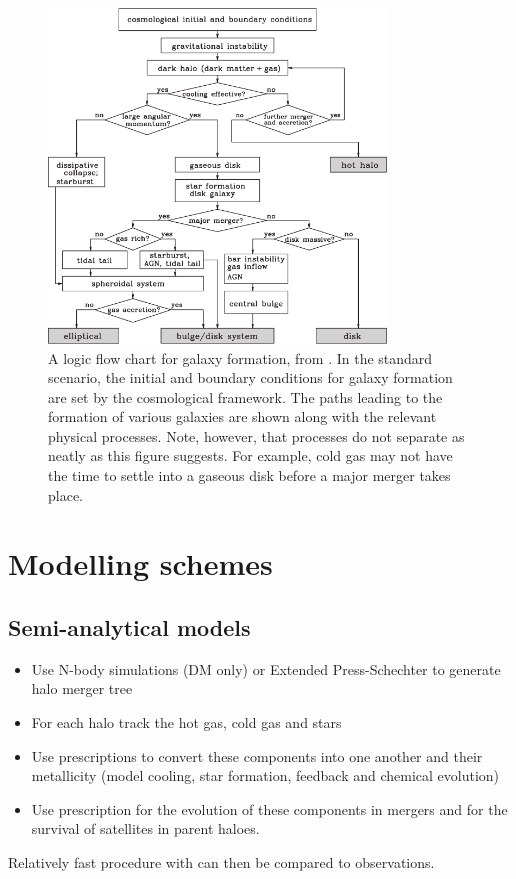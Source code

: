 \begin{figure}
	\includegraphics[width=0.8\textwidth]{img/ch-05/galaxy-decision.pdf}
	\caption{A logic flow chart for galaxy formation, from \cite{galaxy-formation}. In the standard scenario, the initial and boundary conditions for galaxy formation are set by the cosmological framework. The paths leading to the formation of various galaxies are shown along with the relevant physical processes. Note, however, that processes do not separate as neatly as this figure suggests. For example, cold gas may not have the time to settle into a gaseous disk before a major merger takes place.}
	\label{fig:galaxy-decision}
\end{figure}


\section{Modelling schemes}

\subsection{Semi-analytical models}
\begin{itemize}
	\item Use N-body simulations (DM only) or Extended Press-Schechter to generate halo merger tree
	\item For each halo track the hot gas, cold gas and stars
	\item Use prescriptions to convert these components into one another and their metallicity (model cooling, star formation, feedback and chemical evolution)
	\item Use prescription for the evolution of these components in mergers and for the survival of satellites in parent haloes.
\end{itemize}
Relatively fast procedure with can then be compared to observations.

